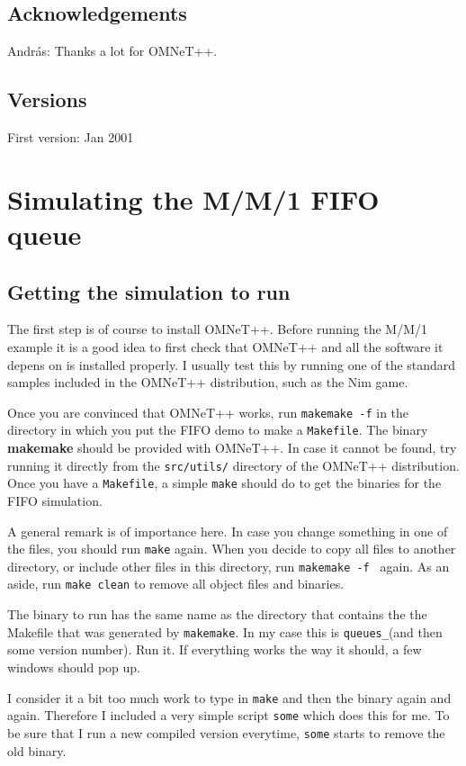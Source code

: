 \documentclass[a4paper]{article}
\begin{document}
\subsection{Acknowledgements}
\label{sec:acknowledgements}
Andr{\'a}s: Thanks a lot for OMNeT++.


\subsection{Versions}
\noindent First version: Jan 2001

\section{Simulating the M/M/1 FIFO queue}
\label{sec:simulating-mm1-fifo}

\subsection{Getting the simulation to run}
\label{sec:getting-it-running}
The first step is of course to install OMNeT++. Before running the
M/M/1 example it is a good idea to first check that OMNeT++ and all
the software it depens on is installed properly. I usually test this
by running one of the standard samples included in the OMNeT++
distribution, such as the Nim game. 

Once you are convinced that OMNeT++ works, run \texttt{makemake -f} in
the directory in which you put the FIFO demo to make a
\texttt{Makefile}. The binary \textbf{makemake} should be provided with OMNeT++.
In case it cannot be found, try running it directly from the
\texttt{src/utils/} directory of the OMNeT++ distribution. Once you
have a \texttt{Makefile}, a simple \texttt{make} should do to get the
binaries for the FIFO simulation.  

A general remark is of importance here. In case you change something in one
of the files, you should run \texttt{make} again. When you decide to
copy all files to another directory, or include other files in this
directory, run \texttt{makemake -f } again. As an aside, run
\texttt{make clean} to remove all object files and binaries.

The binary to run has the same name as the directory that contains the
the Makefile that was generated by \texttt{makemake}. In my case this
is \texttt{queues\_}(and then some version number). Run it. If
everything works the way it should, a few windows should pop up.

I consider it a bit too much work to type in \texttt{make} and then
the binary  again and again. Therefore I included a very
simple script \texttt{some} which does this for me. To be sure that I
run a new compiled version everytime, \texttt{some} starts to remove
the old binary.
\end{document}
